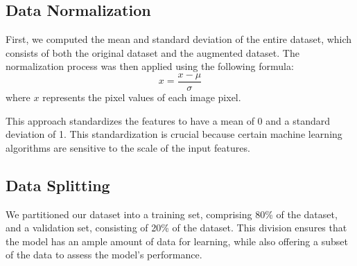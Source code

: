 	\subsection{Data Normalization}
	First, we computed the mean and standard deviation of the entire dataset, which consists of both the original dataset and the augmented dataset. The normalization process was then applied using the following formula:
	\begin{equation}
	x = \frac{x - \mu}{\sigma}
	\end{equation}
	where \(x\) represents the pixel values of each image pixel.
	
	This approach standardizes the features to have a mean of 0 and a standard deviation of 1. This standardization is crucial because certain machine learning algorithms are sensitive to the scale of the input features.

	\subsection{Data Splitting}
	We partitioned our dataset into a training set, comprising 80\% of the dataset, and a validation set, consisting of 20\% of the dataset. This division ensures that the model has an ample amount of data for learning, while also offering a subset of the data to assess the model's performance.

